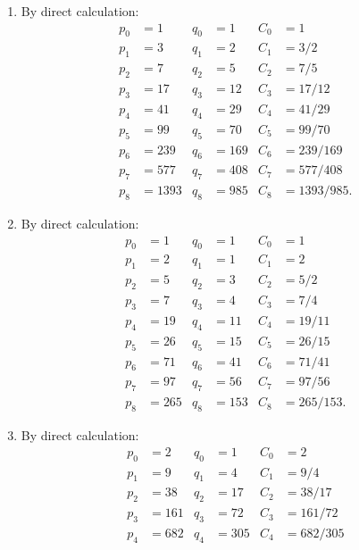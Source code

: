 \begin{solution}
    \begin{enumerate}
        \item By direct calculation:
        \begin{align*}
            p_0 &= 1 & q_0 &= 1 & C_0 &= 1 \\
            p_1 &= 3 & q_1 &= 2 & C_1 &= 3/2 \\
            p_2 &= 7 & q_2 &= 5 & C_2 &= 7/5 \\
            p_3 &= 17 & q_3 &= 12 & C_3 &= 17/12 \\
            p_4 &= 41 & q_4 &= 29 & C_4 &= 41/29 \\
            p_5 &= 99 & q_5 &= 70 & C_5 &= 99/70 \\
            p_6 &= 239 & q_6 &= 169 & C_6 &= 239/169 \\
            p_7 &= 577 & q_7 &= 408 & C_7 &= 577/408 \\
            p_8 &= 1393 & q_8 &= 985 & C_8 &= 1393/985.
        \end{align*}
        \item By direct calculation:
        \begin{align*}
            p_0 &= 1 & q_0 &= 1 & C_0 &= 1 \\
            p_1 &= 2 & q_1 &= 1 & C_1 &= 2 \\
            p_2 &= 5 & q_2 &= 3 & C_2 &= 5/2 \\
            p_3 &= 7 & q_3 &= 4 & C_3 &= 7/4 \\
            p_4 &= 19 & q_4 &= 11 & C_4 &= 19/11 \\
            p_5 &= 26 & q_5 &= 15 & C_5 &= 26/15 \\
            p_6 &= 71 & q_6 &= 41 & C_6 &= 71/41 \\
            p_7 &= 97 & q_7 &= 56 & C_7 &= 97/56 \\
            p_8 &= 265 & q_8 &= 153 & C_8 &= 265/153.
        \end{align*}
        \item By direct calculation:
        \begin{align*}
            p_0 &= 2 & q_0 &= 1 & C_0 &= 2 \\
            p_1 &= 9 & q_1 &= 4 & C_1 &= 9/4 \\
            p_2 &= 38 & q_2 &= 17 & C_2 &= 38/17 \\
            p_3 &= 161 & q_3 &= 72 & C_3 &= 161/72 \\
            p_4 &= 682 & q_4 &= 305 & C_4 &= 682/305 \\

\end{align*}
\end{enumerate}
\end{solution}
